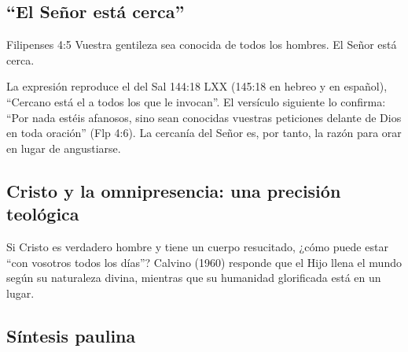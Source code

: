 \subsection{“El Señor está cerca”}

\begin{verso}{Filipenses 4:5}
Vuestra gentileza sea conocida de todos los hombres. El Señor está cerca.
\end{verso}

La expresión  reproduce el  del Sal 144:18 LXX (145:18 en hebreo y en español), ``Cercano está el \SENOR{} a todos los que le invocan''. El versículo siguiente lo confirma: ``Por nada estéis afanosos, sino sean conocidas vuestras peticiones delante de Dios en toda oración'' (Flp 4:6). La cercanía del Señor es, por tanto, la razón para orar en lugar de angustiarse.


\subsection{Cristo y la omnipresencia: una precisión teológica}

Si Cristo es verdadero hombre y tiene un cuerpo resucitado, ¿cómo puede estar ``con vosotros todos los días''? Calvino (1960) responde que el Hijo llena el mundo según su naturaleza divina, mientras que su humanidad glorificada está en un lugar.


\subsection{Síntesis paulina}

